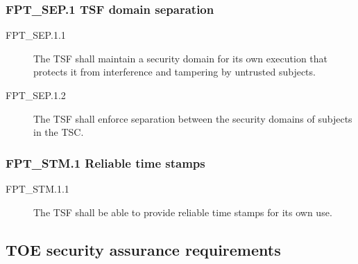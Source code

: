 \documentclass[10pt,a4paper,english]{article}
\begin{document}

\hypertarget{fpt-sep-1-tsf-domain-separation}{}
\subsubsection*{FPT{\_}SEP.1 TSF domain separation}
\begin{description}
\item[FPT{\_}SEP.1.1 ]

The TSF shall maintain a security domain for its own execution that
protects it from interference and tampering by untrusted
subjects.

\item[FPT{\_}SEP.1.2 ]

The TSF shall enforce separation between the
security domains of subjects in the TSC.

\end{description}



\hypertarget{fpt-stm-1-reliable-time-stamps}{}
\subsubsection*{FPT{\_}STM.1 Reliable time stamps}
\begin{description}
\item[FPT{\_}STM.1.1]

The TSF shall be able to provide reliable time stamps for its own use.

\end{description}



\hypertarget{toe-security-assurance-requirements}{}
\subsection*{TOE security assurance requirements}
\end{document}

